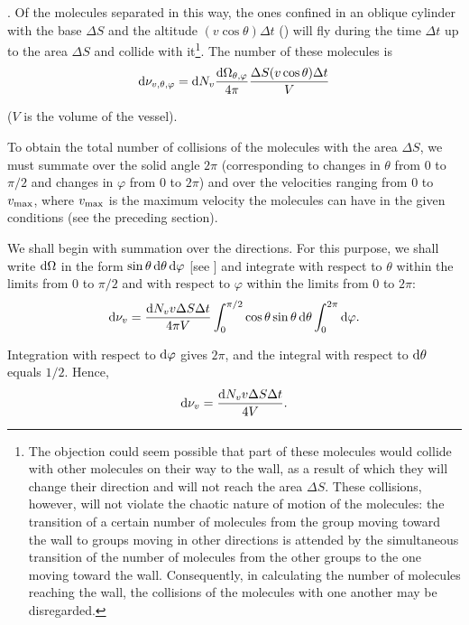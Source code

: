. Of the molecules separated in this way, the ones confined in an oblique cylinder with the base $\Delta S$ and the altitude $(v\cos\theta)\Delta t$ () will fly during the time $\Delta t$ up to the area $\Delta S$ and collide with it\footnote{The objection could seem possible that part of these molecules would collide with other molecules on their way to the wall, as a result of which they will change their direction and will not reach the area $\Delta S$. These collisions, however, will not violate the chaotic nature of motion of the molecules: the transition of a certain number of molecules from the group moving toward the wall to groups moving in other directions is attended by the simultaneous transition of the number of molecules from the other groups to the one moving toward the wall. Consequently, in calculating the number of molecules reaching the wall, the collisions of the molecules with one another may be disregarded.}. The number of these molecules is
\begin{equation}\label{eq:11_19}
	\mathrm{d}\nu_{v,\theta,\varphi} = \mathrm{d} N_v \frac{\mathrm{d}\Omega_{\theta,\varphi}}{4\pi}\frac{\Delta S (v\cos\theta)\Delta t}{V}
\end{equation}

\noindent
($V$ is the volume of the vessel).

To obtain the total number of collisions of the molecules with the area $\Delta S$, we must summate  over the solid angle $2\pi$ (corresponding to changes in $\theta$ from $0$ to $\pi/2$ and changes in $\varphi$ from $0$ to $2\pi$) and over the velocities ranging from $0$ to $v_{\text{max}}$, where $v_{\text{max}}$ is the maximum velocity the molecules can have in the given conditions (see the preceding section).

We shall begin with summation over the directions. For this purpose, we shall write $\mathrm{d}\Omega$ in the form $\sin\theta\,\mathrm{d}\theta\,\mathrm{d}\varphi$ [see ] and integrate  with respect to $\theta$ within the limits from $0$ to $\pi/2$ and with respect to $\varphi$ within the limits from $0$ to $2\pi$:
\begin{equation*}
	\mathrm{d}\nu_v = \frac{\mathrm{d} N_v v \Delta S \Delta t}{4\pi V} \int_{0}^{\pi/2} \cos\theta\sin\theta\,\mathrm{d}\theta \int_{0}^{2\pi} \mathrm{d}\varphi.
\end{equation*}

\noindent
Integration with respect to $\mathrm{d}\varphi$ gives $2\pi$, and the integral with respect to $\mathrm{d}\theta$ equals $1/2$. Hence,
\begin{equation}\label{eq:11_20}
	\mathrm{d}\nu_{v} = \frac{\mathrm{d} N_v v \Delta S \Delta t}{4V}.
\end{equation}

